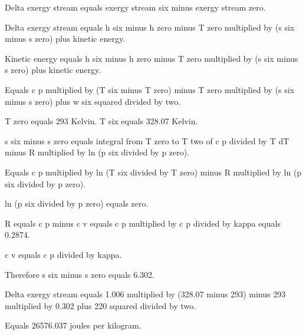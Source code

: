 Delta exergy stream equals exergy stream six minus exergy stream zero.  

Delta exergy stream equals h six minus h zero minus T zero multiplied by (s six minus s zero) plus kinetic energy.  

Kinetic energy equals h six minus h zero minus T zero multiplied by (s six minus s zero) plus kinetic energy.  

Equals c p multiplied by (T six minus T zero) minus T zero multiplied by (s six minus s zero) plus w six squared divided by two.  

T zero equals 293 Kelvin.  
T six equals 328.07 Kelvin.  

s six minus s zero equals integral from T zero to T two of c p divided by T dT minus R multiplied by ln (p six divided by p zero).  

Equals c p multiplied by ln (T six divided by T zero) minus R multiplied by ln (p six divided by p zero).  

ln (p six divided by p zero) equals zero.  

R equals c p minus c v equals c p multiplied by c p divided by kappa equals 0.2874.  

c v equals c p divided by kappa.  

Therefore s six minus s zero equals 6.302.  

Delta exergy stream equals 1.006 multiplied by (328.07 minus 293) minus 293 multiplied by 0.302 plus 220 squared divided by two.  

Equals 26576.037 joules per kilogram.